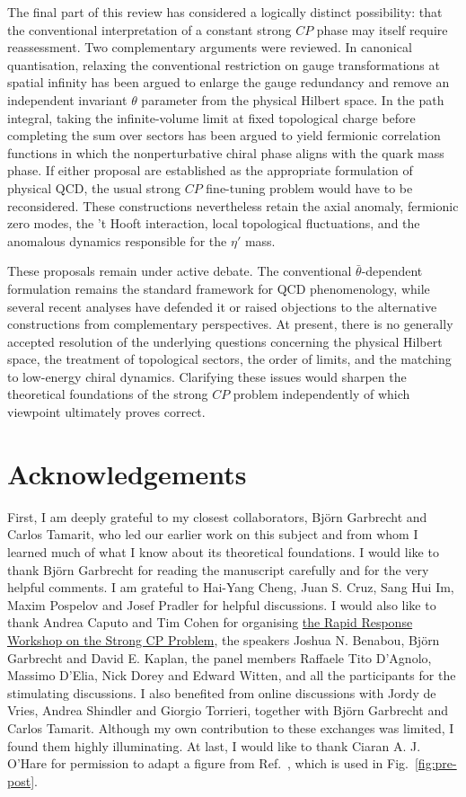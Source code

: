 \documentclass[review]{elsarticle}
\numberwithin{equation}{section}
\numberwithin{table}{section}
\numberwithin{figure}{section}
\begin{document}
The final part of this review has considered a logically distinct possibility: that the conventional interpretation of a constant strong $CP$ phase may itself require reassessment. Two complementary arguments were reviewed. In canonical quantisation, relaxing the conventional restriction on gauge transformations at spatial infinity has been argued to enlarge the gauge redundancy and remove an independent invariant $\theta$ parameter from the physical Hilbert space. In the path integral, taking the infinite-volume limit at fixed topological charge before completing the sum over sectors has been argued to yield fermionic correlation functions in which the nonperturbative chiral phase aligns with the quark mass phase. If either proposal are established as the appropriate formulation of physical QCD, the usual strong $CP$ fine-tuning problem would have to be reconsidered. These constructions nevertheless retain the axial anomaly, fermionic zero modes, the 't Hooft interaction, local topological fluctuations, and the anomalous dynamics responsible for the $\eta'$ mass.

These proposals remain under active debate. The conventional $\bar\theta$-dependent formulation remains the standard framework for QCD phenomenology, while several recent analyses have defended it or raised objections to the alternative constructions from complementary perspectives. At present, there is no generally accepted resolution of the underlying questions concerning the physical Hilbert space, the treatment of topological sectors, the order of limits, and the matching to low-energy chiral dynamics. Clarifying these issues would sharpen the theoretical foundations of the strong $CP$ problem independently of which viewpoint ultimately proves correct.



\section{Acknowledgements}

First, I am deeply grateful to my closest collaborators, Björn Garbrecht and Carlos Tamarit, who led our earlier work on this subject and from whom I learned much of what I know about its theoretical foundations. I would like to thank Björn Garbrecht for reading the manuscript carefully and for the very helpful comments. I am grateful to Hai-Yang Cheng, Juan S. Cruz, Sang Hui Im, Maxim Pospelov and Josef Pradler for helpful discussions. I would also like to thank Andrea Caputo and Tim Cohen for organising \href{https://indico.cern.ch/event/1617813/}{the Rapid Response Workshop on the Strong CP Problem}, the speakers Joshua N. Benabou, Björn Garbrecht and David E. Kaplan, the panel members Raffaele Tito D'Agnolo, Massimo D'Elia, Nick Dorey and Edward Witten, and all the participants for the stimulating discussions. I also benefited from online discussions with Jordy de Vries, Andrea Shindler and Giorgio Torrieri, together with Björn Garbrecht and Carlos Tamarit. Although my own contribution to these exchanges was limited, I found them highly illuminating. At last, I would like to thank Ciaran A. J. O’Hare for permission to adapt a figure from Ref.~\cite{OHare:2024nmr}, which is used in Fig.~\ref{fig:pre-post}.
\end{document}
